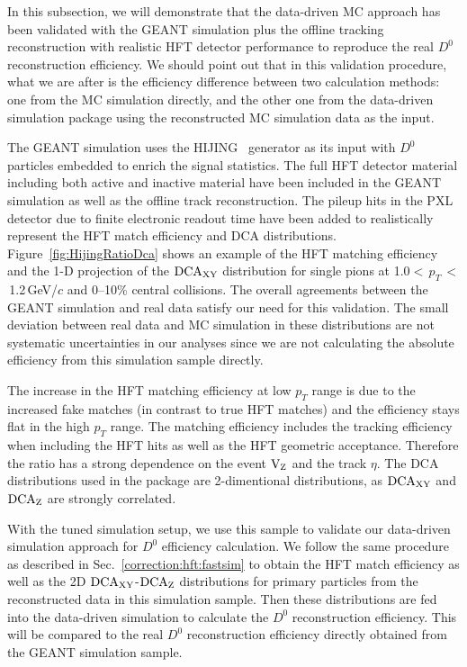 \documentclass[%
 reprint,	
 amsmath,amssymb,
 aps,
 prc,
]{revtex4-1}
\begin{document}
In this subsection, we will demonstrate that the data-driven MC approach has been validated with the GEANT simulation plus the offline tracking reconstruction with realistic HFT detector performance to reproduce the real $D^0$ reconstruction efficiency. We should point out that in this validation procedure, what we are after is the efficiency difference between two calculation methods: one from the MC simulation directly, and the other one from the data-driven simulation package using the reconstructed MC simulation data as the input.

The GEANT simulation uses the HIJING~\cite{HIJING} generator as its input with $D^0$ particles embedded to enrich the signal statistics. The full HFT detector material including both active and inactive material have been included in the GEANT simulation as well as the offline track reconstruction. The pileup hits in the PXL detector due to finite electronic readout time have been added to realistically represent the HFT match efficiency and DCA distributions. Figure~\ref{fig:HijingRatioDca} shows an example of the HFT matching efficiency and the 1-D projection of the $\textup{DCA}_{\textup{XY}}$ distribution for single pions at 1.0$<$\,$p_{T}$\,$<$\,1.2\,GeV/$c$ and 0--10\% central collisions. The overall agreements between the GEANT simulation and real data satisfy our need for this validation. The small deviation between real data and MC simulation in these distributions are not systematic uncertainties in our analyses since we are not calculating the absolute efficiency from this simulation sample directly.

The increase in the HFT matching efficiency at low $p_{T}$ range is due to the increased fake matches (in contrast to true HFT matches) and the efficiency stays flat in the high $p_{T}$ range. The matching efficiency includes the tracking efficiency when including the HFT hits as well as the HFT geometric acceptance. Therefore the ratio has a strong dependence on the event $\textup{V}_\textup{Z}$ and the track $\eta$. The DCA distributions used in the package are 2-dimentional distributions, as $\textup{DCA}_{\textup{XY}}$ and $\textup{DCA}_\textup{Z}$ are strongly correlated.


With the tuned simulation setup, we use this sample to validate our data-driven simulation approach for $D^0$ efficiency calculation. We follow the same procedure as described in Sec.~\ref{correction:hft:fastsim} to obtain the HFT match efficiency as well as the 2D $\textup{DCA}_\textup{XY}$-$\textup{DCA}_\textup{Z}$ distributions for primary particles from the reconstructed data in this simulation sample. Then these distributions are fed into the data-driven simulation to calculate the $D^0$ reconstruction efficiency. This will be compared to the real $D^0$ reconstruction efficiency directly obtained from the GEANT simulation sample.
\end{document}
